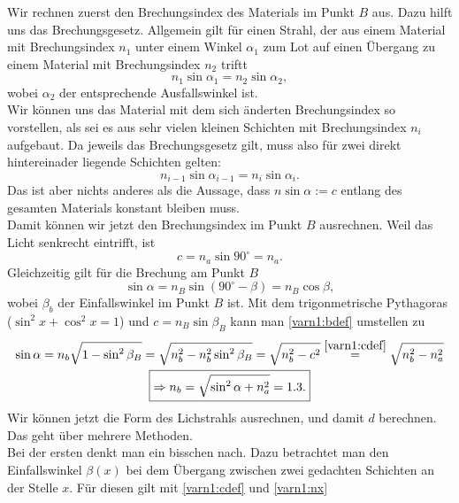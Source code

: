 \begin{Answer}[ref = varn1]
	Wir rechnen zuerst den Brechungsindex des Materials im Punkt $B$ aus. Dazu hilft uns das Brechungsgesetz. Allgemein gilt für einen Strahl, der aus einem Material mit Brechungsindex $n_1$ unter einem Winkel $\alpha_1$ zum Lot auf einen Übergang zu einem Material mit Brechungsindex $n_2$ triftt
	\begin{equation*}
		n_1 \sin \alpha_1 = n_2 \sin \alpha_2,
	\end{equation*}
	wobei $\alpha_2$ der entsprechende Ausfallswinkel ist.\\
	Wir können uns das Material mit dem sich änderten Brechungsindex so vorstellen, als sei es aus sehr vielen kleinen Schichten mit Brechungsindex $n_i$ aufgebaut. Da jeweils das Brechungsgesetz gilt, muss also für zwei direkt hintereinader liegende Schichten gelten:
	\begin{equation*}
		n_{i-1} \sin \alpha_{i-1} = n_{i} \sin \alpha_i.
	\end{equation*}
	Das ist aber nichts anderes als die Aussage, dass $n \sin \alpha := c$ entlang des gesamten Materials konstant bleiben muss.\\
	Damit können wir jetzt den Brechungsindex im Punkt $B$ ausrechnen. Weil das Licht senkrecht eintrifft, ist
	\begin{equation}\label{varn1:cdef}
	c = n_a \sin 90^\circ = n_a.
	\end{equation}
	Gleichzeitig gilt für die Brechung am Punkt $B$ 
	\begin{equation}\label{varn1:bdef}
	\sin \alpha = n_B \sin \left(90^\circ-\beta\right) = n_B \cos \beta ,
	\end{equation}
	wobei $\beta_b$ der Einfallswinkel im Punkt $B$ ist. Mit dem trigonmetrische Pythagoras ($\sin^2 x + \cos^2 x = 1$) und $c = n_B \sin \beta_B$ kann man \eqref{varn1:bdef} umstellen zu
	\begin{multline}\label{varn1:nb}
		\sin \alpha = n_b \sqrt{1-\sin^2 \beta_B} =  \sqrt{n_b^2-n_b^2 \sin^2 \beta_B} = \sqrt{n_b^2-c^2} \overset{\eqref{varn1:cdef}}{=} \sqrt{n_b^2-n_a^2}\\ \boxed{\Rightarrow n_b = \sqrt{\sin^2 \alpha + n_a^2} = 1.3.}
	\end{multline}
	Wir können jetzt die Form des Lichstrahls ausrechnen, und damit $d$ berechnen. Das geht über mehrere Methoden.\\
	Bei der ersten denkt man ein bisschen nach. Dazu betrachtet man den Einfallswinkel $\beta\left(x\right)$ bei dem Übergang zwischen zwei gedachten Schichten an der Stelle $x$. Für diesen gilt mit \eqref{varn1:cdef} und \eqref{varn1:nx}

\end{Answer}
